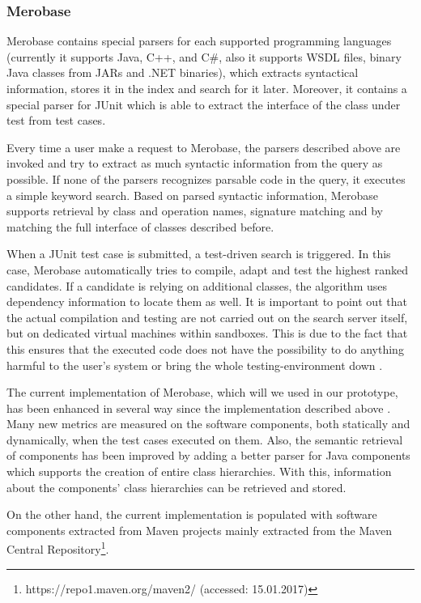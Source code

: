 \subsubsection{Merobase}
\label{subsec:merobase}

Merobase contains special parsers for each supported programming languages (currently it supports Java, C++, and C\#, also it supports WSDL files, binary Java classes from JARs and .NET binaries), which extracts syntactical information, stores it in the index and search for it later. Moreover, it contains a special parser for JUnit which is able to extract the interface of the class under test from test cases.

Every time a user make a request to Merobase, the parsers described above are invoked and try to extract as much syntactic information from the query as possible. If none of the parsers recognizes parsable code in the query, it executes a simple keyword search. Based on parsed syntactic information, Merobase supports retrieval by class and operation names, signature matching and by matching the full interface of classes described before.

When a JUnit test case is submitted, a test-driven search is triggered. In this case, Merobase automatically tries to compile, adapt and test the highest ranked candidates. If a candidate is relying on additional classes, the algorithm uses dependency information to locate them as well. It is important to point out that the actual compilation and testing are not carried out on the search server itself, but on dedicated virtual machines within sandboxes. This is due to the fact that this ensures that the executed code does not have the possibility to do anything harmful to the user's system or bring the whole testing-environment down \citep{Hummel2013}.

The current implementation of Merobase, which will we used in our prototype, has been enhanced in several way since the implementation described above \citep{Kessel2016}. Many new metrics are measured on the software components, both statically and dynamically, when the test cases executed on them. Also, the semantic retrieval of components has been improved by adding a better parser for Java components which supports the creation of entire class hierarchies. With this, information about the components' class hierarchies can be retrieved and stored.

On the other hand, the current implementation is populated with software components extracted from Maven projects mainly extracted from the Maven Central Repository\footnote{https://repo1.maven.org/maven2/ (accessed: 15.01.2017)}. 

